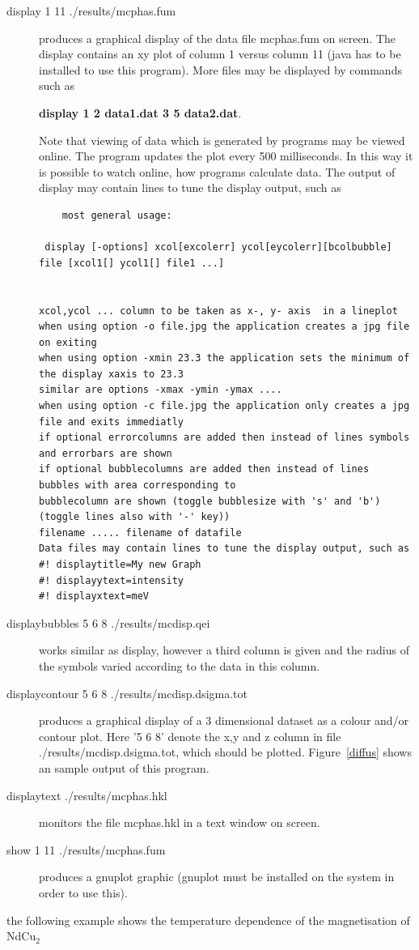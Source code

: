 \begin{description} 
\item [display 1 11 ./results/mcphas.fum] produces a graphical display of the data %
file
mcphas.fum on screen. The display contains an xy plot of column 1 versus column 11
({\prg java} has to be installed to use this program). 
More files may be displayed by commands such as

{\bf display 1 2 data1.dat 3 5 data2.dat}.

Note that viewing of 
data which is generated by programs may be viewed online. The program updates the plot
every 500 milliseconds. In this way it is possible to watch online, how programs
calculate data. The output of display may contain lines to tune the display output, %
such as
\begin{verbatim}
	most general usage: 

 display [-options] xcol[excolerr] ycol[eycolerr][bcolbubble] file [xcol1[] ycol1[] file1 ...]


xcol,ycol ... column to be taken as x-, y- axis  in a lineplot
when using option -o file.jpg the application creates a jpg file on exiting
when using option -xmin 23.3 the application sets the minimum of the display xaxis to 23.3
similar are options -xmax -ymin -ymax ....
when using option -c file.jpg the application only creates a jpg file and exits immediatly
if optional errorcolumns are added then instead of lines symbols and errorbars are shown
if optional bubblecolumns are added then instead of lines bubbles with area corresponding to
bubblecolumn are shown (toggle bubblesize with 's' and 'b')
(toggle lines also with '-' key))
filename ..... filename of datafile
Data files may contain lines to tune the display output, such as
#! displaytitle=My new Graph
#! displayytext=intensity
#! displayxtext=meV 
\end{verbatim} 

\item [displaybubbles  5 6 8 ./results/mcdisp.qei] works similar as display, however
a third column is given and the radius of the symbols varied according to the data in 
this column.

\item [displaycontour 5 6 8 ./results/mcdisp.dsigma.tot] produces a graphical
display of a 3 dimensional dataset as a colour and/or contour plot. Here '5 6 8' 
denote the x,y and z column in file {\prg ./results/mcdisp.dsigma.tot}, which should
be plotted. Figure~\ref{diffus} shows an sample output of this program.

\item [displaytext ./results/mcphas.hkl] monitors the file mcphas.hkl in a text window
on screen.

\item [show 1 11 ./results/mcphas.fum]     produces a gnuplot graphic 
({\prg gnuplot} must be installed
on the system in order to use this).
\end{description} 
the following example shows the temperature dependence of the magnetisation
of NdCu$_2$

